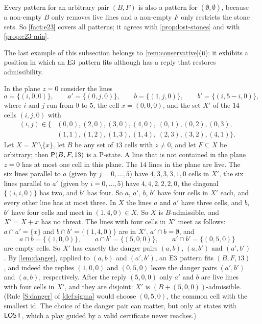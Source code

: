 Every pattern for an arbitrary pair $(B,F)$ is also a pattern for $(\emptyset,\emptyset)$, because a
non-empty $B$ only removes live lines and a non-empty $F$ only restricts the stone sets. So \cref{fact:e23} covers all patterns; it agrees with \cref{prop:lost-stones} and with
\cref{prop:e23-min}.

\smallskip
The last example of this subsection belongs to \cref{rem:conservative}(ii): it exhibits a position in
which an $\mathrm{E3}$ pattern fits although \Breaker{} has a reply that restores admissibility.

\begin{example}\label{ex:conservative}
In the plane $z=0$ consider the lines
\[ a=\{(i,0,0)\},\qquad a'=\{(0,j,0)\},\qquad b=\{(1,j,0)\},\qquad b'=\{(i,5-i,0)\}, \]
where $i$ and $j$ run from $0$ to $5$, the cell $x=(0,0,0)$, and the set $X'$ of the $14$ cells $(i,j,0)$
with
\begin{align*}
(i,j)\in\{&(0,0),(2,0),(3,0),(4,0),\ (0,1),(0,2),(0,3),\\
          &(1,1),(1,2),(1,3),(1,4),\ (2,3),(3,2),(4,1)\}.
\end{align*}
Let $X=X'\setminus\{x\}$, let $B$ be any set of $13$ cells with $z\ne 0$, and let $F\subseteq X$ be arbitrary;
then $\mathsf{P}(B,F,13)$ is a P-state. A line that is not contained in the plane $z=0$ has at most one cell in
this plane. The $14$ lines in the plane are live. The six lines parallel to $a$ (given by $j=0,\dots,5$) have
$4,3,3,3,1,0$ cells in $X'$, the six lines parallel to $a'$ (given by $i=0,\dots,5$) have $4,4,2,2,2,0$, the
diagonal $\{(i,i,0)\}$ has two, and $b'$ has four. So $a$, $a'$, $b$, $b'$ have four cells in $X'$ each, and
every other line has at most three. In $X$ the lines $a$ and $a'$ have three cells, and $b$, $b'$ have four
cells and meet in $(1,4,0)\in X$. So $X$ is $B$-admissible, and $X'=X+x$ has no threat. The lines with four
cells in $X'$ meet as follows: $a\cap a'=\{x\}$ and $b\cap b'=\{(1,4,0)\}$ are in $X'$,
$a'\cap b=\emptyset$, and
\[ a\cap b=\{(1,0,0)\},\qquad a\cap b'=\{(5,0,0)\},\qquad a'\cap b'=\{(0,5,0)\} \]
are empty cells. So $X'$ has exactly the danger pairs $(a,b)$, $(a,b')$ and $(a',b')$. By
\cref{lem:danger}, applied to $(a,b)$ and $(a',b')$, an $\mathrm{E3}$ pattern fits $(B,F,13)$, and indeed the
replies $(1,0,0)$ and $(0,5,0)$ leave the danger pairs $(a',b')$ and $(a,b)$, respectively. After the
reply $(5,0,0)$ only $a'$ and $b$ are live lines with four cells in $X'$, and they are disjoint: $X'$ is
$(B+(5,0,0))$-admissible. (Rule \ref{S:danger} of \cref{def:sigma} would choose $(0,5,0)$, the common
cell with the smallest id. The choice of the danger pair can matter, but only at states with $\mathsf{LOST}$, which a
play guided by a valid certificate never reaches.)
\end{example}
